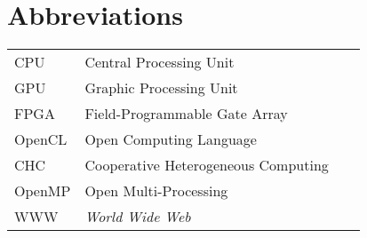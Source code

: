 \chapter*{Abbreviations}

\begin{flushleft}
\begin{tabular}{l p{0.8\linewidth}}
CPU			& Central Processing Unit\\
GPU			& Graphic Processing Unit\\
FPGA		& Field-Programmable Gate Array\\
OpenCL		& Open Computing Language\\
CHC			& Cooperative Heterogeneous Computing\\
OpenMP		& Open Multi-Processing\\

WWW      & \emph{World Wide Web}
\end{tabular}
\end{flushleft}

